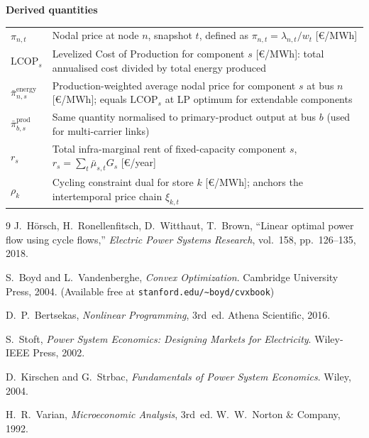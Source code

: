 \documentclass{article}
\begin{document}
\medskip
\noindent\textbf{Derived quantities}\par\smallskip
\noindent\begin{tabular}{lp{11cm}}
$\pi_{n,t}$ & Nodal price at node $n$, snapshot $t$, defined as
              $\pi_{n,t} = \lambda_{n,t}/w_t$ [\euro/MWh] \\
$\mathrm{LCOP}_s$ & Levelized Cost of Production for component $s$ [\euro/MWh]:
                    total annualised cost divided by total energy produced \\
$\bar{\pi}^{\mathrm{energy}}_{n,s}$ & Production-weighted average nodal price for component $s$
                    at bus $n$ [\euro/MWh]; equals $\mathrm{LCOP}_s$ at LP optimum
                    for extendable components \\
$\bar{\pi}^{\mathrm{prod}}_{b,s}$ & Same quantity normalised to primary-product output at bus $b$
                    (used for multi-carrier links) \\
$r_s$ & Total infra-marginal rent of fixed-capacity component $s$,
        $r_s = \sum_t \bar{\mu}_{s,t} G_s$ [\euro/year] \\
$\rho_k$ & Cycling constraint dual for store $k$ [\euro/MWh];
           anchors the intertemporal price chain $\xi_{k,t}$ \\
\end{tabular}

\renewcommand{\arraystretch}{1}
\setlength{\tabcolsep}{6pt}

\begin{thebibliography}{9}
J.~H\"orsch, H.~Ronellenfitsch, D.~Witthaut, T.~Brown,
``Linear optimal power flow using cycle flows,''
\textit{Electric Power Systems Research}, vol.~158, pp.~126--135, 2018.

S.~Boyd and L.~Vandenberghe,
\textit{Convex Optimization}.
Cambridge University Press, 2004.
(Available free at \texttt{stanford.edu/\textasciitilde boyd/cvxbook})

D.~P.~Bertsekas,
\textit{Nonlinear Programming}, 3rd~ed.
Athena Scientific, 2016.

S.~Stoft,
\textit{Power System Economics: Designing Markets for Electricity}.
Wiley-IEEE Press, 2002.

D.~Kirschen and G.~Strbac,
\textit{Fundamentals of Power System Economics}.
Wiley, 2004.

H.~R.~Varian,
\textit{Microeconomic Analysis}, 3rd~ed.
W.~W.~Norton \& Company, 1992.
\end{thebibliography}
\end{document}

